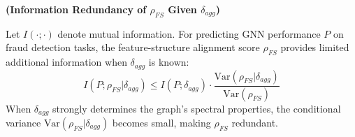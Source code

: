 
\begin{theorem}
\label{thm:info_redundancy}
\textbf{(Information Redundancy of $\rho_{FS}$ Given $\delta_{agg}$)}

Let $I(\cdot; \cdot)$ denote mutual information. For predicting GNN performance $P$ on fraud detection tasks, the feature-structure alignment score $\rho_{FS}$ provides limited additional information when $\delta_{agg}$ is known:
\begin{equation}
I(P; \rho_{FS} | \delta_{agg}) \leq I(P; \delta_{agg}) \cdot \frac{\text{Var}(\rho_{FS} | \delta_{agg})}{\text{Var}(\rho_{FS})}
\end{equation}
When $\delta_{agg}$ strongly determines the graph's spectral properties, the conditional variance $\text{Var}(\rho_{FS} | \delta_{agg})$ becomes small, making $\rho_{FS}$ redundant.
\end{theorem}

